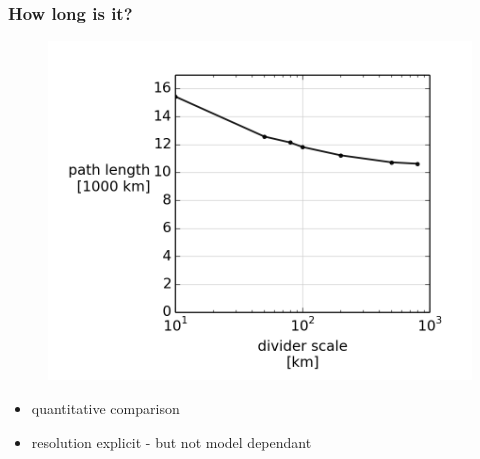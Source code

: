 \begin{frame}
\frametitle{How long is it?}
\begin{minipage}{0.45\textwidth}
    \begin{figure}      
    \includegraphics[width=\textwidth]{figures/plots/mandelbrot_lengths.png}\end{figure}
\end{minipage}
\hfill
\begin{minipage}{0.45\textwidth}
    \begin{itemize}
        \item quantitative comparison
        \item resolution explicit - but not model dependant
    \end{itemize}
\end{minipage}
\end{frame}